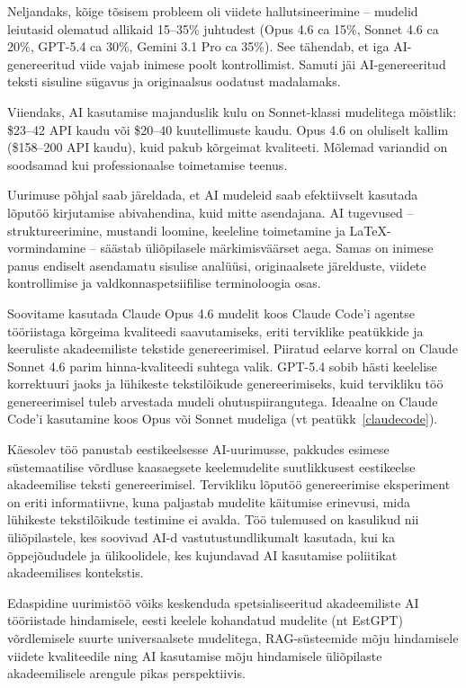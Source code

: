 Neljandaks, kõige tõsisem probleem oli viidete hallutsineerimine -- mudelid leiutasid olematud allikaid 15--35\% juhtudest (Opus 4.6 ca 15\%, Sonnet 4.6 ca 20\%, GPT-5.4 ca 30\%, Gemini 3.1 Pro ca 35\%). See tähendab, et iga AI-genereeritud viide vajab inimese poolt kontrollimist. Samuti jäi AI-genereeritud teksti sisuline sügavus ja originaalsus oodatust madalamaks.

Viiendaks, AI kasutamise majanduslik kulu on Sonnet-klassi mudelitega mõistlik: \$23--42 API kaudu või \$20--40 kuutellimuste kaudu. Opus 4.6 on oluliselt kallim (\$158--200 API kaudu), kuid pakub kõrgeimat kvaliteeti. Mõlemad variandid on soodsamad kui professionaalse toimetamise teenus.

Uurimuse põhjal saab järeldada, et AI mudeleid saab efektiivselt kasutada lõputöö kirjutamise abivahendina, kuid mitte asendajana. AI tugevused -- struktureerimine, mustandi loomine, keeleline toimetamine ja LaTeX-vormindamine -- säästab üliõpilasele märkimisväärset aega. Samas on inimese panus endiselt asendamatu sisulise analüüsi, originaalsete järelduste, viidete kontrollimise ja valdkonnaspetsiifilise terminoloogia osas.

Soovitame kasutada Claude Opus 4.6 mudelit koos Claude Code'i agentse tööriistaga kõrgeima kvaliteedi saavutamiseks, eriti terviklike peatükkide ja keeruliste akadeemiliste tekstide genereerimisel. Piiratud eelarve korral on Claude Sonnet 4.6 parim hinna-kvaliteedi suhtega valik. GPT-5.4 sobib hästi keelelise korrektuuri jaoks ja lühikeste tekstilõikude genereerimiseks, kuid tervikliku töö genereerimisel tuleb arvestada mudeli ohutuspiirangutega. Ideaalne on Claude Code'i kasutamine koos Opus või Sonnet mudeliga (vt peatükk~\ref{claudecode}).

Käesolev töö panustab eestikeelsesse AI-uurimusse, pakkudes esimese süstemaatilise võrdluse kaasaegsete keelemudelite suutlikkusest eestikeelse akadeemilise teksti genereerimisel. Tervikliku lõputöö genereerimise eksperiment on eriti informatiivne, kuna paljastab mudelite käitumise erinevusi, mida lühikeste tekstilõikude testimine ei avalda. Töö tulemused on kasulikud nii üliõpilastele, kes soovivad AI-d vastutustundlikumalt kasutada, kui ka õppejõududele ja ülikoolidele, kes kujundavad AI kasutamise poliitikat akadeemilises kontekstis.

Edaspidine uurimistöö võiks keskenduda spetsialiseeritud akadeemiliste AI tööriistade hindamisele, eesti keelele kohandatud mudelite (nt EstGPT) võrdlemisele suurte universaalsete mudelitega, RAG-süsteemide mõju hindamisele viidete kvaliteedile ning AI kasutamise mõju hindamisele üliõpilaste akadeemilisele arengule pikas perspektiivis.
